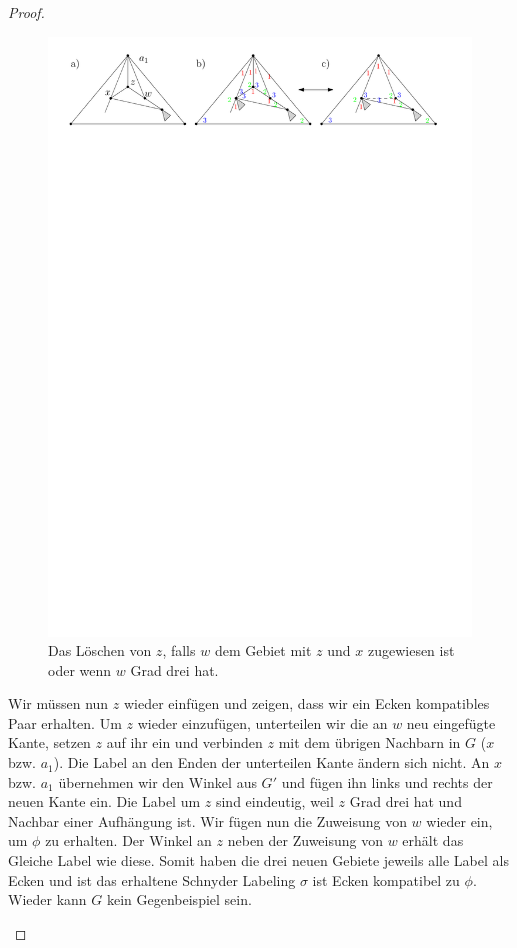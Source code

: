 \begin{proof}
\begin{description}[leftmargin =0pt, font = \bfseries]
\begin{figure}[h]
	\centering
	  \includegraphics[width=1\textwidth]{lem5_5.pdf}
    	\caption{Das Löschen von $z$, falls $w$ dem Gebiet mit $z$ und $x$ zugewiesen ist oder wenn $w$ Grad drei hat.}
    	\label{pic_lem5_5}
\end{figure}

Wir müssen nun $z$ wieder einfügen und zeigen, dass wir ein Ecken kompatibles Paar erhalten. Um $z$ wieder einzufügen, unterteilen wir die an $w$ neu eingefügte Kante, setzen $z$ auf ihr ein und verbinden $z$ mit dem übrigen Nachbarn in $G$ ($x$ bzw. $a_1$). Die Label an den Enden der unterteilen Kante ändern sich nicht. An $x$ bzw. $a_1$ übernehmen wir den Winkel aus $G'$ und fügen ihn links und rechts der neuen Kante ein. Die Label um $z$ sind eindeutig, weil $z$ Grad drei hat und Nachbar einer Aufhängung ist. Wir fügen nun die Zuweisung von $w$ wieder ein, um $\phi$ zu erhalten. Der Winkel an $z$ neben der Zuweisung von $w$ erhält das Gleiche Label wie diese. Somit haben die drei neuen Gebiete jeweils alle Label als Ecken und ist das erhaltene Schnyder Labeling $\sigma$ ist Ecken kompatibel zu $\phi$. Wieder kann $G$ kein Gegenbeispiel sein.


\end{description}
\end{proof}
